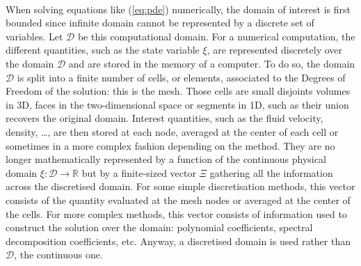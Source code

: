     \paragraph{}
    When solving equations like (\ref{eq:pde}) numerically, the domain of interest is first bounded since infinite domain cannot be represented by a discrete set of variables.
    Let $\mathcal{D}$ be this computational domain.
    For a numerical computation, the different quantities, such as the state variable $\xi$, are represented discretely over the domain $\mathcal{D}$ and are stored in the memory of a computer.
    To do so, the domain $\mathcal{D}$ is split into a finite number of cells, or elements, associated to the Degrees of Freedom of the solution: this is the mesh.
    Those cells are small disjoints volumes in 3D, faces in the two-dimensional space or segments in 1D, such as their union recovers the original domain.
    Interest quantities, such as the fluid velocity, density, \dots, are then stored at each node, averaged at the center of each cell or sometimes in a more complex fashion depending on the method.
    They are no longer mathematically represented by a function of the continuous physical domain $\xi: \mathcal{D} \rightarrow \mathbb{R}$ but by a finite-sized vector $\Xi$ gathering all the information across the discretised domain.
    For some simple discretisation methods, this vector consists of the quantity evaluated at the mesh nodes or averaged at the center of the cells.
    For more complex methods, this vector consists of information used to construct the solution over the domain: polynomial coefficients, spectral decomposition coefficients, etc.
    Anyway, a discretised domain is used rather than $\mathcal{D}$, the continuous one.

